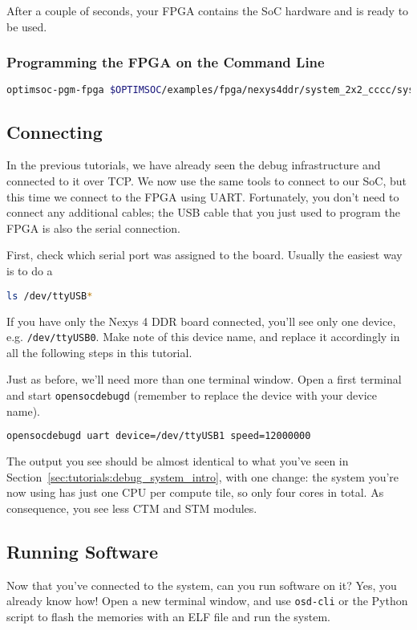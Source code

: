 After a couple of seconds, your FPGA contains the SoC hardware and is ready to be used.

\subsubsection{Programming the FPGA on the Command Line}
\begin{lstlisting}[language=sh]
optimsoc-pgm-fpga $OPTIMSOC/examples/fpga/nexys4ddr/system_2x2_cccc/system_2x2_cccc_nexys4ddr.bit xc7a100t_0
\end{lstlisting}


\subsection{Connecting}
In the previous tutorials, we have already seen the debug infrastructure and connected to it over TCP.
We now use the same tools to connect to our SoC, but this time we connect to the FPGA using UART.
Fortunately, you don't need to connect any additional cables; the USB cable that you just used to program the FPGA is also the serial connection.

First, check which serial port was assigned to the board.
Usually the easiest way is to do a
\begin{lstlisting}[language=sh]
ls /dev/ttyUSB*
\end{lstlisting}

If you have only the Nexys 4 DDR board connected, you'll see only one device, e.g. \verb|/dev/ttyUSB0|.
Make note of this device name, and replace it accordingly in all the following steps in this tutorial.

Just as before, we'll need more than one terminal window.
Open a first terminal and start \verb|opensocdebugd| (remember to replace the device with your device name).
\begin{lstlisting}[language=sh]
opensocdebugd uart device=/dev/ttyUSB1 speed=12000000
\end{lstlisting}

The output you see should be almost identical to what you've seen in Section~\ref{sec:tutorials:debug_system_intro}, with one change:
the system you're now using has just one CPU per compute tile, so only four cores in total.
As consequence, you see less CTM and STM modules.

\subsection{Running Software}
Now that you've connected to the system, can you run software on it?
Yes, you already know how!
Open a new terminal window, and use \verb|osd-cli| or the Python script to flash the memories with an ELF file and run the system.

